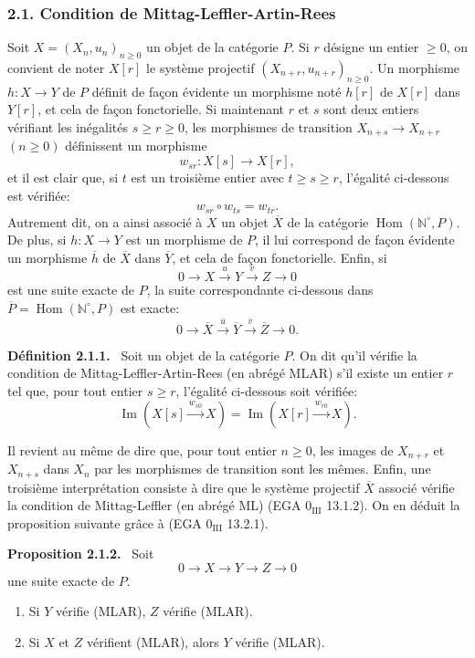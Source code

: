 \documentclass[11pt]{article}
\providecommand{\NN}{\mathbb{N}}
\newenvironment{statement}[1]{\par\medskip\noindent\textbf{#1.}\ }{\par\medskip}
\DeclareMathOperator{\Hom}{Hom}
\providecommand{\Hom}{\operatorname{Hom}}
\providecommand{\NN}{\mathbb N}
\providecommand{\Im}{\operatorname{Im}}
\renewcommand{\Im}{\operatorname{Im}}
\providecommand{\Im}{\operatorname{Im}}
\begin{document}
\subsubsection*{2.1. Condition de Mittag-Leffler-Artin-Rees}
Soit $X=(X_n,u_n)_{n\ge0}$ un objet de la catégorie $P$. Si $r$ désigne un entier $\ge0$, on convient de noter $X[r]$ le système projectif $(X_{n+r},u_{n+r})_{n\ge0}$. Un morphisme $h:X\to Y$ de $P$ définit de façon évidente un morphisme noté $h[r]$ de $X[r]$ dans $Y[r]$, et cela de façon fonctorielle. Si maintenant $r$ et $s$ sont deux entiers vérifiant les inégalités $s\ge r\ge0$, les morphismes de transition $X_{n+s}\to X_{n+r}$ $(n\ge0)$ définissent un morphisme
\[
w_{sr}:X[s]\longrightarrow X[r],
\]
et il est clair que, si $t$ est un troisième entier avec $t\ge s\ge r$, l'égalité ci-dessous est vérifiée:
\[
w_{sr}\circ w_{ts}=w_{tr}.
\]
Autrement dit, on a ainsi associé à $X$ un objet $\overline X$ de la catégorie $\Hom(\NN^\circ,P)$. De plus, si $h:X\to Y$ est un morphisme de $P$, il lui correspond de façon évidente un morphisme $\overline h$ de $\overline X$ dans $\overline Y$, et cela de façon fonctorielle. Enfin, si
\[
0\longrightarrow X\stackrel{u}{\longrightarrow}Y\stackrel{v}{\longrightarrow}Z\longrightarrow0
\]
est une suite exacte de $P$, la suite correspondante ci-dessous dans $\overline P=\Hom(\NN^\circ,P)$ est exacte:
\[
0\longrightarrow\overline X\stackrel{\overline u}{\longrightarrow}\overline Y\stackrel{\overline v}{\longrightarrow}\overline Z\longrightarrow0.
\]

\begin{statement}{Définition 2.1.1}
Soit un objet de la catégorie $P$. On dit qu'il vérifie la condition de Mittag-Leffler-Artin-Rees (en abrégé MLAR) s'il existe un entier $r$ tel que, pour tout entier $s\ge r$, l'égalité ci-dessous soit vérifiée:
\[
\Im(X[s]\xrightarrow{w_{s0}}X)=\Im(X[r]\xrightarrow{w_{r0}}X).
\]
\end{statement}
Il revient au même de dire que, pour tout entier $n\ge0$, les images de $X_{n+r}$ et $X_{n+s}$ dans $X_n$ par les morphismes de transition sont les mêmes. Enfin, une troisième interprétation consiste à dire que le système projectif $\overline X$ associé vérifie la condition de Mittag-Leffler (en abrégé ML) (EGA $0_{\mathrm{III}}$ 13.1.2). On en déduit la proposition suivante grâce à (EGA $0_{\mathrm{III}}$ 13.2.1).

\begin{statement}{Proposition 2.1.2}
Soit
\[
0\longrightarrow X\longrightarrow Y\longrightarrow Z\longrightarrow0
\]
une suite exacte de $P$.
\begin{enumerate}[label=(\roman*)]
\item Si $Y$ vérifie (MLAR), $Z$ vérifie (MLAR).
\item Si $X$ et $Z$ vérifient (MLAR), alors $Y$ vérifie (MLAR).
\end{enumerate}
\end{statement}
\end{document}
